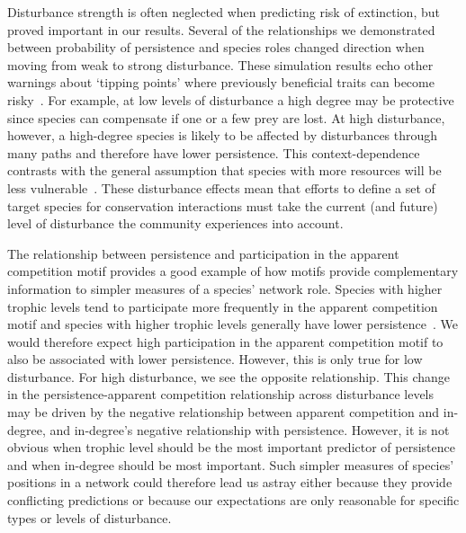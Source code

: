 \documentclass[12pt]{article}
\begin{document}
\begin{spacing}{2.0}
    Disturbance strength is often neglected when predicting risk of extinction, but proved important in our results.
    Several of the relationships we demonstrated between probability of persistence and species roles changed direction when moving from weak to strong disturbance.
    These simulation results echo other warnings about `tipping points' where previously beneficial traits can become risky~\citep{Latty2019,Golubski2016,Tylianakis2014}.
    For example, at low levels of disturbance a high degree may be protective since species can compensate if one or a few prey are lost. 
    At high disturbance, however, a high-degree species is likely to be affected by disturbances through many paths and therefore have lower persistence.
    This context-dependence contrasts with the general assumption that species with more resources will be less vulnerable~\citep{Allesina2012,binzer2011susceptibility}.
    These disturbance effects mean that efforts to define a set of target species for conservation interactions must take the current (and future) level of disturbance the community experiences into account.
    

    The relationship between persistence and participation in the apparent competition motif provides a good example of how motifs provide complementary information to simpler measures of a species' network role.
    Species with higher trophic levels tend to participate more frequently in the apparent competition motif and
    species with higher trophic levels generally have lower persistence~\citep{Eklof2006,Eklof2013}. We would therefore expect high participation in the apparent competition motif to also be associated with lower persistence.
    However, this is only true for low disturbance. 
    For high disturbance, we see the opposite relationship.
    This change in the persistence-apparent competition relationship across disturbance levels may be driven by the negative relationship between apparent competition and in-degree, and in-degree's negative relationship with persistence.
    However, it is not obvious when trophic level should be the most important predictor of persistence and when in-degree should be most important.
    Such simpler measures of species' positions in a network could therefore lead us astray either because they provide conflicting predictions or because our expectations are only reasonable for specific types or levels of disturbance.



\end{spacing}
\end{document}
